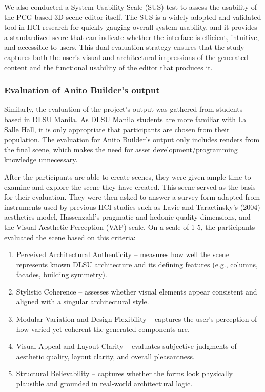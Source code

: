 \documentclass[manuscript,screen,12pt]{article}
\begin{document}
We also conducted a System Usability Scale (SUS) test to assess the usability of the PCG-based 3D scene editor itself. The SUS is a widely adopted and validated tool in HCI research for quickly gauging overall system usability, and it provides a standardized score that can indicate whether the interface is efficient, intuitive, and accessible to users. This dual-evaluation strategy ensures that the study captures both the user’s visual and architectural impressions of the generated content and the functional usability of the editor that produces it.

\subsubsection{Evaluation of Anito Builder's output}

Similarly, the evaluation of the project’s output was gathered from students based in DLSU Manila. As DLSU Manila students are more familiar with La Salle Hall, it is only appropriate that participants are chosen from their population. The evaluation for Anito Builder’s output only includes renders from the final scene, which makes the need for asset development/programming knowledge unnecessary. 

After the participants are able to create scenes, they were given ample time to examine and explore the scene they have created. This scene served as the basis for their evaluation. They were then asked to answer a survey form adapted from instruments used by previous HCI studies such as Lavie and Taractinsky’s (2004) aesthetics model, Hassenzahl’s pragmatic and hedonic quality dimensions, and the Visual Aesthetic Perception (VAP) scale. On a scale of 1-5, the participants evaluated the scene based on this criteria: 

\begin{enumerate}
    \item Perceived Architectural Authenticity – measures how well the scene represents known DLSU architecture and its defining features (e.g., columns, facades, building symmetry).
    \item Stylistic Coherence – assesses whether visual elements appear consistent and aligned with a singular architectural style.
    \item Modular Variation and Design Flexibility – captures the user’s perception of how varied yet coherent the generated components are.
    \item Visual Appeal and Layout Clarity – evaluates subjective judgments of aesthetic quality, layout clarity, and overall pleasantness.
    \item Structural Believability – captures whether the forms look physically plausible and grounded in real-world architectural logic.
\end{enumerate}
\end{document}
